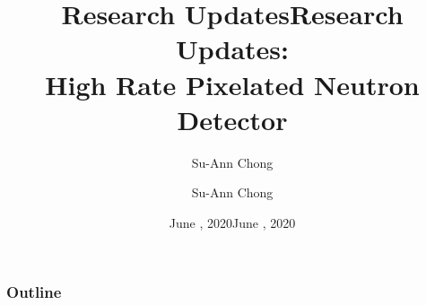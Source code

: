 \documentclass[xcolor=x11names, compress, handout]{beamer}
\title{Research Updates}
\author{Su-Ann Chong}
\date{June \nth{5}, 2020}
\renewcommand{\(}{\begin{columns}}
\renewcommand{\)}{\end{columns}}
\newcommand{\<}[1]{\begin{column}{#1}}
\renewcommand{\>}{\end{column}}
\begin{document}
\begin{frame}[plain]
  \title{Research Updates:\\\large{High Rate Pixelated Neutron Detector}}

  \author{Su-Ann Chong}
  \date{June , 2020}
  \titlepage
\end{frame}


\begin{frame}
  \frametitle{Outline}
  \centering
  \begin{minipage}[t][0.5\textheight]{0.75\textwidth}
   \linespread{2.0}
   \tableofcontents
 \end{minipage}
\end{frame}
\end{document}

